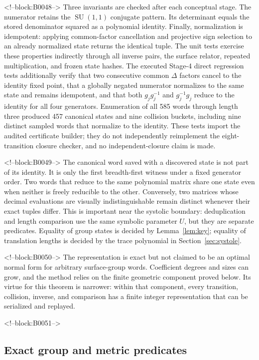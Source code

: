 \documentclass[11pt,a4paper]{article}
\theoremstyle{definition}
\newcommand{\SU}{\operatorname{SU}}
\begin{document}
<!--block:B0048-->
Three invariants are checked after each conceptual stage.  The numerator
retains the \(\SU(1,1)\) conjugate pattern.  Its determinant equals the stored
denominator squared as a polynomial identity.  Finally, normalization is
idempotent: applying common-factor cancellation and projective sign selection
to an already normalized state returns the identical tuple.  The unit tests
exercise these properties indirectly through all inverse pairs, the surface
relator, repeated multiplication, and frozen state hashes.  The executed
Stage-4 direct regression tests additionally verify that two consecutive
common \(\Delta\) factors cancel to the identity fixed point, that a globally
negated numerator normalizes to the same state and remains idempotent, and
that both \(g_jg_j^{-1}\) and \(g_j^{-1}g_j\) reduce to the identity for all
four generators.  Enumeration of all 585 words through length three produced
457 canonical states and nine collision buckets, including nine distinct
sampled words that normalize to the identity.  These tests import the audited
certificate builder; they do not independently reimplement the
eight-transition closure checker, and no independent-closure claim is made.

<!--block:B0049-->
The canonical word saved with a discovered state is not part of its identity.
It is only the first breadth-first witness under a fixed generator order.
Two words that reduce to the same polynomial matrix share one state even when
neither is freely reducible to the other.  Conversely, two matrices whose
decimal evaluations are visually indistinguishable remain distinct whenever
their exact tuples differ.  This is important near the systolic boundary:
deduplication and length comparison use the same symbolic parameter \(U\), but
they are separate predicates.  Equality of group states is decided by
Lemma~\ref{lem:key}; equality of translation lengths is decided by the trace
polynomial in Section~\ref{sec:systole}.

<!--block:B0050-->
The representation is exact but not claimed to be an optimal normal form for
arbitrary surface-group words.  Coefficient degrees and sizes can grow, and
the method relies on the finite geometric component proved below.  Its virtue
for this theorem is narrower: within that component, every transition,
collision, inverse, and comparison has a finite integer representation that
can be serialized and replayed.

<!--block:B0051-->
\subsection{Exact group and metric predicates}
\end{document}
